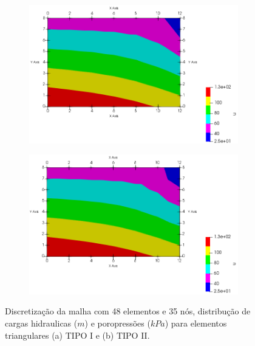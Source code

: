 \documentclass{article} %
\begin{document}
\begin{figure}[H]
	\begin{subfigure}[b]{0.49\textwidth}
		\includegraphics[width=\textwidth]{case3au}
		\caption{}
		\label{}
	\end{subfigure}
	\begin{subfigure}[b]{0.49\textwidth}
		\includegraphics[width=\textwidth]{case3bu}
		\caption{}
		\label{}
	\end{subfigure}
	\caption{Discretização da malha com 48 elementos e 35 nós, distribução de cargas hidraulicas (\(m\)) e poropressões (\(kPa\)) para elementos triangulares (a) TIPO I e (b) TIPO II.}\label{}
\end{figure}






%
%
\end{document}
